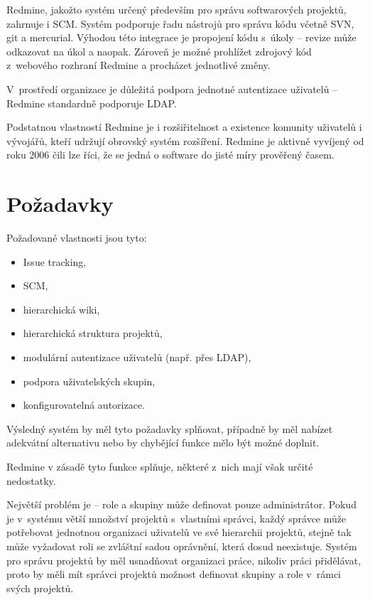 \documentclass[thesis=B,czech]{FITthesis}[2012/05/02]
\begin{document}
Redmine, jakožto systém určený především pro správu softwarových
projektů, zahrnuje i \gls{SCM}. Systém podporuje řadu nástrojů pro
správu kódu včetně \gls{SVN}, \gls{git} a \gls{mercurial}. Výhodou této
integrace je propojení kódu s~úkoly -- revize může odkazovat na úkol a
naopak. Zároveň je možné prohlížet zdrojový kód z~webového rozhraní
Redmine a procházet jednotlivé změny.

V~prostředí organizace je důležitá podpora jednotné autentizace
uživatelů -- Redmine standardně podporuje \gls{LDAP}.

Podstatnou vlastností Redmine je i rozšiřitelnost a existence komunity
uživatelů i vývojářů, kteří udržují obrovský systém rozšíření. Redmine
je aktivně vyvíjený od roku 2006 čili lze říci, že se jedná o software
do jisté míry prověřený časem.

\section{Požadavky}

Požadované vlastnosti jsou tyto:

\begin{itemize}
\item
  Issue tracking,
\item
  \gls{SCM},
\item
  hierarchická wiki,
\item
  hierarchická struktura projektů,
\item
  modulární autentizace uživatelů (např. přes \gls{LDAP}),
\item
  podpora uživatelských skupin,
\item
  konfigurovatelná autorizace.
\end{itemize}
Výsledný systém by měl tyto požadavky splňovat, případně by měl nabízet
adekvátní alternativu nebo by chybějící funkce mělo být možné doplnit.

Redmine v zásadě tyto funkce splňuje, některé z~nich mají však určité
nedostatky.

Největší problém je  -- role a skupiny může definovat
pouze administrátor. Pokud je v~systému větší množství projektů
s~vlastními správci, každý správce může potřebovat jednotnou organizaci
uživatelů ve své hierarchii projektů, stejně tak může vyžadovat roli se
zvláštní sadou oprávnění, která dosud neexistuje. Systém pro správu
projektů by měl usnadňovat organizaci práce, nikoliv práci přidělávat,
proto by měli mít správci projektů možnost definovat skupiny a role
v~rámci svých projektů.
\end{document}
